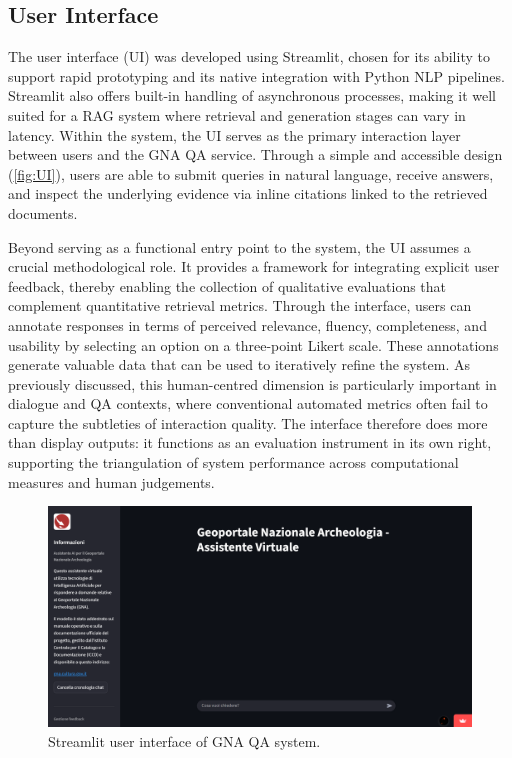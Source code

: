\begin{spacing}{1.5}
\section{User Interface}
The user interface (UI) was developed using Streamlit, chosen for its ability to support rapid prototyping and its native integration with Python NLP pipelines. Streamlit also offers built-in handling of asynchronous processes, making it well suited for a RAG system where retrieval and generation stages can vary in latency. Within the system, the UI serves as the primary interaction layer between users and the GNA QA service. Through a simple and accessible design (\autoref{fig:UI}), users are able to submit queries in natural language, receive answers, and inspect the underlying evidence via inline citations linked to the retrieved documents.

Beyond serving as a functional entry point to the system, the UI assumes a crucial methodological role. It provides a framework for integrating explicit user feedback, thereby enabling the collection of qualitative evaluations that complement quantitative retrieval metrics. Through the interface, users can annotate responses in terms of perceived relevance, fluency, completeness, and usability by selecting an option on a three-point Likert scale. These annotations generate valuable data that can be used to iteratively refine the system. As previously discussed, this human-centred dimension is particularly important in dialogue and QA contexts, where conventional automated metrics often fail to capture the subtleties of interaction quality. The interface therefore does more than display outputs: it functions as an evaluation instrument in its own right, supporting the triangulation of system performance across computational measures and human judgements.

\vspace{0.8em}
\begin{figure}[H]
  \centering
  \includegraphics[width=\textwidth]{images/UI_full.png} 
  \caption{Streamlit user interface of GNA QA system.}
  \label{fig:UI}
\end{figure}


\end{spacing}
